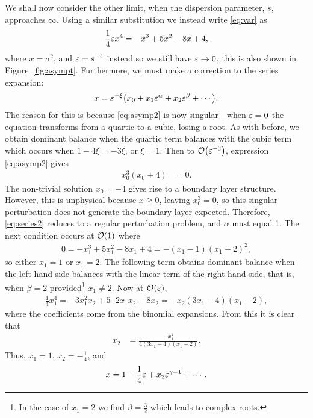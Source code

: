 We shall now consider the other limit, when the dispersion parameter, $s$, approaches $\infty$. Using a similar substitution we instead write \eqref{eq:var} as
\begin{align}
\label{eq:asymp2}
\frac{1}{4} \varepsilon x^4 = -x^3 + 5x^2 - 8x + 4,
\end{align}
where $x = \sigma^2$, and $\varepsilon = s^{-4}$ instead so we still have $\varepsilon \rightarrow 0$, this is also shown in Figure~\ref{fig:asympt}. Furthermore, we must make a correction to the series expansion:
\begin{align}
\label{eq:series2}
x = \eps^{-\xi} \left( x_0 + x_1 \eps^\alpha + x_2 \eps^\beta + \cdots \right).
\end{align}
The reason for this is because \eqref{eq:asymp2} is now singular---when $\varepsilon=0$ the equation transforms from a quartic to a cubic, losing a root. As with before, we obtain dominant balance when the quartic term balances with the cubic term which occurs when $1 - 4 \xi = -3 \xi$, or $\xi = 1$. Then to $\bigO{\eps^{-3}}$, expression \eqref{eq:asymp2} gives
\begin{align*}
x_0^3 (x_0 + 4) &= 0.
\end{align*}
The non-trivial solution $x_0 = -4$ gives rise to a boundary layer structure. However, this is unphysical because $x \geq 0$, leaving $x_0^3 = 0$, so this singular perturbation does not generate the boundary layer expected. Therefore, \eqref{eq:series2} reduces to a regular perturbation problem, and $\alpha$ must equal 1. The next condition occurs at $\bigO{1}$ where
\begin{align*}
0 = -x_1^3 + 5x_1^2 - 8x_1 + 4 = -(x_1 - 1)(x_1 - 2)^2,
\end{align*}
so either $x_1 = 1$ or $x_1 = 2$. The following term obtains dominant balance when the left hand side balances with the linear term of the right hand side, that is, when $\beta = 2$ provided\footnote{In the case of $x_1 = 2$ we find $\beta = \frac{3}{2}$ which leads to complex roots.} $x_1 \ne 2$. Now at $\bigO{\eps}$,
\begin{align*}
\frac{1}{4} x_1^4 = -3x_1^2 x_2 + 5\cdot2 x_1 x_2 - 8x_2 = -x_2 (3x_1 - 4)(x_1 - 2),
\end{align*}
where the coefficients come from the binomial expansions. From this it is clear that
\begin{align*}
x_2 &= \frac{-x_1^4}{4(3x_1 - 4)(x_1 - 2)}.
\end{align*}
Thus, $x_1 = 1$, $x_2 = -\frac{1}{4}$, and
\begin{align*}
x = 1 - \frac{1}{4} \varepsilon + x_2 \varepsilon^{\gamma - 1} + \cdots.
\end{align*}
